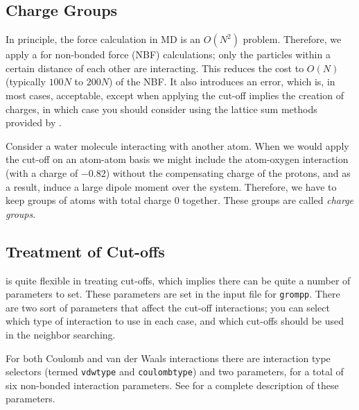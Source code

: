 \subsection{Charge Groups}
\label{sec:cg}
In principle, the force calculation in MD is an $O(N^2)$ problem.
Therefore, we apply a  for non-bonded force (NBF)
calculations; only the particles within a certain distance of each
other are interacting. This reduces the cost to $O(N)$ (typically
$100N$ to $200N$) of the NBF. It also introduces an error, which is,
in most cases, acceptable, except when applying the cut-off implies
the creation of charges, in which case you should consider using the
lattice sum methods provided by {\gromacs}.

Consider a water molecule interacting with another atom. When we would apply
the cut-off on an atom-atom basis we might include the atom-oxygen
interaction (with a charge of $-0.82$) without the compensating charge
of the protons, and as a result, induce a large dipole moment over the system.
Therefore, we have to keep groups of atoms with total charge
0 together. These groups are called {\em charge groups}.

\subsection{Treatment of Cut-offs}
\newcommand{\rs}{$r_{short}$}
\newcommand{\rl}{$r_{long}$}
{\gromacs} is quite flexible in treating cut-offs, which implies
there can be quite a number of parameters to set. These parameters are
set in the input file for {\tt grompp}. There are two sort of parameters
that affect the cut-off interactions; you can select which type
of interaction to use in each case, and which cut-offs should be
used in the neighbor searching.

For both Coulomb and van der Waals interactions there are interaction
type selectors (termed {\tt vdwtype} and {\tt coulombtype}) and two
parameters, for a total of six non-bonded interaction parameters. See
 for a complete description of these parameters.

